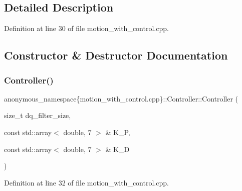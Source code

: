 \subsection{Detailed Description}


Definition at line 30 of file motion\+\_\+with\+\_\+control.\+cpp.



\subsection{Constructor \& Destructor Documentation}
\mbox{\label{classanonymous__namespace_02motion__with__control_8cpp_03_1_1Controller_aeb856dda629bace767a9cfa421a54008}} 
\subsubsection{\texorpdfstring{Controller()}{Controller()}}
{\footnotesize\ttfamily anonymous\+\_\+namespace\{motion\+\_\+with\+\_\+control.\+cpp\}\+::Controller\+::\+Controller (\begin{DoxyParamCaption}\item[{size\+\_\+t}]{dq\+\_\+filter\+\_\+size,  }\item[{const std\+::array$<$ double, 7 $>$ \&}]{K\+\_\+P,  }\item[{const std\+::array$<$ double, 7 $>$ \&}]{K\+\_\+D }\end{DoxyParamCaption})\hspace{0.3cm}{\ttfamily [inline]}}



Definition at line 32 of file motion\+\_\+with\+\_\+control.\+cpp.


